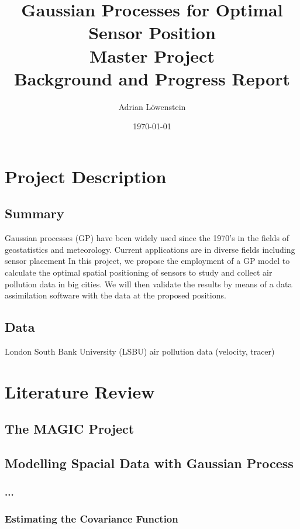 \documentclass[11pt,a4paper]{article}
\title{Gaussian Processes for Optimal Sensor Position \\
Master Project \\
Background and Progress Report 
}							%
\author{Adrian Löwenstein}								%
\date{\today}											%
\numberwithin{equation}{section}
\begin{document}
\maketitle
\pagebreak

\section{Project Description}

\subsection{Summary}
Gaussian processes (GP) have been widely used since the 1970’s in the fields of geostatistics and meteorology. Current applications are in diverse fields including sensor placement
In this project, we propose the employment of a GP model to calculate the optimal spatial positioning of sensors to study and collect air pollution data in big cities. We will then validate the results by means of a data assimilation software with the data at the proposed positions.

\subsection{Data}
London South Bank University (LSBU) air pollution data (velocity, tracer)

\section{Literature Review}

\subsection{The MAGIC Project}

\subsection{Modelling Spacial Data with Gaussian Process}

\subsubsection{ ... }

\subsubsection{Estimating the Covariance Function}
\end{document}
